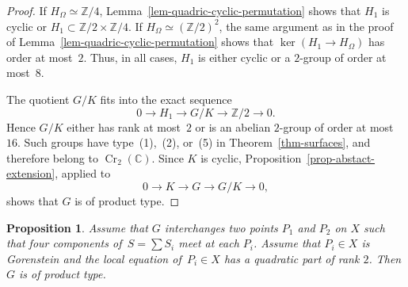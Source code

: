 \documentclass[11pt]{amsart}
\numberwithin{equation}{section}
\newtheorem{proposition}[thm]{Proposition}
\theoremstyle{definition}
\theoremstyle{remark}
\newcommand{\lra}{\longrightarrow}
\DeclareMathOperator{\Cr}{Cr}
\begin{document}
\begin{proof}
If $H_\Omega\simeq\mathbb Z/4$, Lemma~\ref{lem-quadric-cyclic-permutation} shows that $H_1$ is cyclic or $H_1\subset\mathbb Z/2\times\mathbb Z/4$. If $H_\Omega\simeq(\mathbb Z/2)^2$, the same argument as in the proof of Lemma~\ref{lem-quadric-cyclic-permutation} shows that $\ker(H_1\to H_\Omega)$ has order at most~$2$. Thus, in all cases, $H_1$ is either cyclic or a $2$-group of order at most~$8$.

The quotient $G/K$ fits into the exact sequence
\[
0\lra H_1\lra G/K\lra\mathbb Z/2\lra0.
\]
Hence $G/K$ either has rank at most~$2$ or is an abelian $2$-group of order at most~$16$. Such groups have type~(1),~(2), or~(5) in Theorem~\ref{thm-surfaces}, and therefore belong to $\Cr_2(\mathbb C)$. Since $K$ is cyclic, Proposition~\ref{prop-abstact-extension}, applied to
\[
0\lra K\lra G\lra G/K\lra0,
\]
shows that $G$ is of product type.
\color{black}
\end{proof}



\begin{proposition}
\label{prop-lc-gorenstein-4comp-2}
Assume that $G$ interchanges two points $P_1$ and $P_2$ on $X$ such that four components of\, $S=\sum S_i$ meet at each $P_i$.  Assume that $P_i\in X$ is Gorenstein and the local equation of\, $P_i\in X$ has a quadratic part of rank $2$. Then $G$ is of product type.
\end{proposition}
\end{document}
